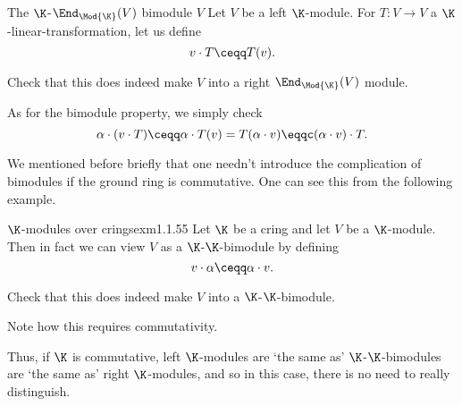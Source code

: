 \begin{exm}{The $\K$-$\End _{\Mod{\K}}(V)$ bimodule $V$}
	Let $V$ be a left $\K$-module.  For $T\colon V\rightarrow V$ a $\K$-linear-transformation, let us define
	\begin{equation}
		v\cdot T\ceqq T(v).
	\end{equation}
	\begin{exr}[breakable=false]{}{}
		Check that this does indeed make $V$ into a right $\End _{\Mod{\K}}(V)$ module.
	\end{exr}
	As for the bimodule property, we simply check
	\begin{equation}
		\alpha \cdot (v\cdot T)\ceqq \alpha \cdot T(v)=T(\alpha \cdot v)\eqqc (\alpha \cdot v)\cdot T.
	\end{equation}
\end{exm}
We mentioned before briefly that one needn't introduce the complication of bimodules if the ground ring is commutative.  One can see this from the following example.
\begin{exm}{$\K$-modules over crings}{exm1.1.55}
	Let $\K$ be a cring and let $V$ be a $\K$-module.  Then in fact we can view $V$ as a $\K$-$\K$-bimodule by defining
	\begin{equation}
		v\cdot \alpha \ceqq \alpha \cdot v.
	\end{equation}
	\begin{exr}[breakable=false]{}{}
		Check that this does indeed make $V$ into a $\K$-$\K$-bimodule.
		\begin{rmk}
			Note how this requires commutativity.
		\end{rmk}
	\end{exr}
	Thus, if $\K$ is commutative, left $\K$-modules are `the same as' $\K$-$\K$-bimodules are `the same as' right $\K$-modules, and so in this case, there is no need to really distinguish.
\end{exm}

